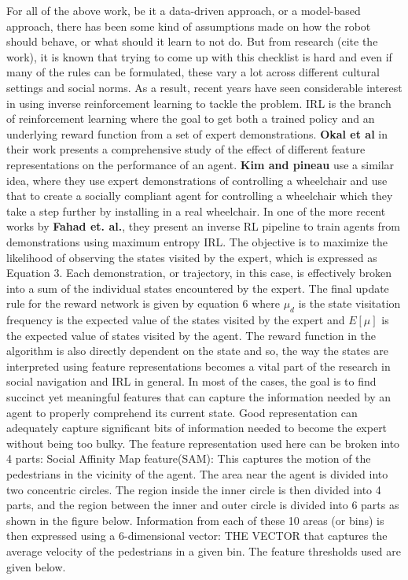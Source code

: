 For all of the above work, be it a data-driven approach, or a model-based approach, there has been some kind of assumptions made on how the robot should behave, or what should it learn to not do. But from research (cite the work), it is known that trying to come up with this checklist is hard and even if many of the rules can be formulated, these vary a lot across different cultural settings and social norms. As a result, recent years have seen considerable interest in using inverse reinforcement learning to tackle the problem. IRL is the branch of reinforcement learning where the goal to get both a trained policy and an underlying reward function from a set of expert demonstrations.
\textbf{Okal et al} in their work presents a comprehensive study of the effect of different feature representations on the performance of an agent.
\textbf{Kim and pineau} use a similar idea, where they use expert demonstrations of controlling a wheelchair and use that to create a socially compliant agent for controlling a wheelchair which they take a step further by installing in a real wheelchair. 
In one of the more recent works by \textbf{Fahad et. al.}, they present an inverse RL pipeline to train agents from demonstrations using maximum entropy IRL.
The objective is to maximize the likelihood of observing the states visited by the expert, which is expressed as Equation 3.
Each demonstration, or trajectory, in this case, is effectively broken into a sum of the individual states encountered by the expert. The final update rule for the reward network is given by equation 6 
where $\mu_{d}$ is the state visitation frequency is the expected value of the states visited by the expert and $E[\mu]$ is the expected value of states visited by the agent. The reward function in the algorithm is also directly dependent on the state and so, the way the states are interpreted using feature representations becomes a vital part of the research in social navigation and IRL in general. 
In most of the cases, the goal is to find succinct yet meaningful features that can capture the information needed by an agent to properly comprehend its current state. Good representation can adequately capture significant bits of information needed to become the expert without being too bulky.  The feature representation used here can be broken into 4 parts:
Social Affinity Map feature(SAM): This captures the motion of the pedestrians in the vicinity of the agent. The area near the agent is divided into two concentric circles. The region inside the inner circle is then divided into 4 parts, and the region between the inner and outer circle is divided into 6 parts as shown in the figure below.
Information from each of these 10 areas (or bins) is then expressed using a 6-dimensional vector:
THE VECTOR	
that captures the average velocity of the pedestrians in a given bin. The feature thresholds used are given below.

